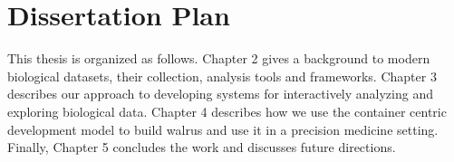 \section{Dissertation Plan} 
This thesis is organized as follows. Chapter 2 gives a background to modern
biological datasets, their collection, analysis tools and frameworks. Chapter 3
describes our approach to developing systems for interactively analyzing and
exploring biological data. Chapter 4 describes how we use the container centric
development model to build walrus and use it in a precision medicine setting.
Finally, Chapter 5 concludes the work and discusses future directions. 

